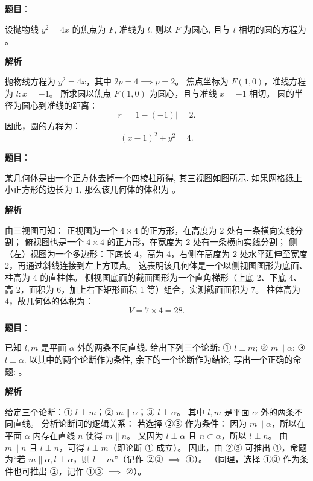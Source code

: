 \begin{answer}

\textbf{题目}：

设抛物线 $y^2 = 4x$ 的焦点为 $F$, 准线为 $l$. 则以 $F$ 为圆心, 且与 $l$ 相切的圆的方程为 \gkblank{}。

\textbf{解析}

抛物线方程为 $y^2 = 4x$，其中 $2p = 4 \implies p = 2$。
焦点坐标为 $F(1, 0)$，准线方程为 $l: x = -1$。
所求圆以焦点 $F(1, 0)$ 为圆心，且与准线 $x = -1$ 相切。
圆的半径为圆心到准线的距离：
\nopagebreak[4]
\[r = |1 - (-1)| = 2.\]
因此，圆的方程为：
\nopagebreak[4]
\[(x - 1)^2 + y^2 = 4.\]


\end{answer}
\begin{answer}

\textbf{题目}：

某几何体是由一个正方体去掉一个四棱柱所得, 其三视图如图所示. 如果网格纸上小正方形的边长为 $1$, 那么该几何体的体积为 \gkblank{}。
\nopagebreak[4]
\begin{center}\end{center}
\nopagebreak[4]
\textbf{解析}

由三视图可知：
正视图为一个 $4 \times 4$ 的正方形，在高度为 2 处有一条横向实线分割；
俯视图也是一个 $4 \times 4$ 的正方形，在宽度为 2 处有一条横向实线分割；
侧（左）视图为一个多边形：下底长 4，高为 4，右侧在高度为 2 处水平延伸至宽度 2，再通过斜线连接到左上方顶点。
这表明该几何体是一个以侧视图图形为底面、柱高为 4 的直柱体。
侧视图底面的截面图形为一个直角梯形（上底 2、下底 4、高 2，面积为 6，加上右下矩形面积 1 等）组合，实测截面面积为 7。
柱体高为 4，故几何体的体积为：
\nopagebreak[4]
\[V = 7 \times 4 = 28.\]


\end{answer}
\begin{answer}

\textbf{题目}：

已知 $l, m$ 是平面 $\alpha$ 外的两条不同直线. 给出下列三个论断:
① $l \perp m$;
② $m \parallel \alpha$;
③ $l \perp \alpha$.
以其中的两个论断作为条件, 余下的一个论断作为结论, 写出一个正确的命题: \gkblank{}。

\textbf{解析}

给定三个论断：① $l \perp m$；② $m \parallel \alpha$；③ $l \perp \alpha$。
其中 $l, m$ 是平面 $\alpha$ 外的两条不同直线。
分析论断间的逻辑关系：
若选择 ②③ 作为条件：
因为 $m \parallel \alpha$，所以在平面 $\alpha$ 内存在直线 $n$ 使得 $m \parallel n$。
又因为 $l \perp \alpha$ 且 $n \subset \alpha$，所以 $l \perp n$。
由 $m \parallel n$ 且 $l \perp n$，可得 $l \perp m$（即论断 ① 成立）。
因此，由 ②③ 可推出 ①，命题为“若 $m \parallel \alpha, l \perp \alpha$，则 $l \perp m$”（记作 ②③ $\implies$ ①）。
（同理，选择 ①③ 作为条件也可推出 ②，记作 ①③ $\implies$ ②）。


\end{answer}
